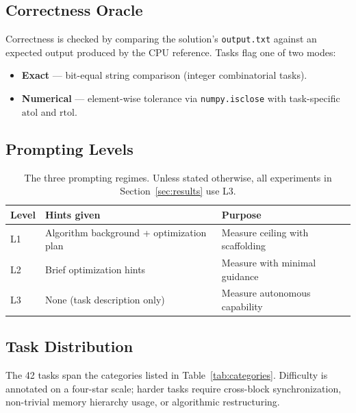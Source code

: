 \documentclass{article}
\begin{document}
\subsection{Correctness Oracle}

Correctness is checked by comparing the solution's \texttt{output.txt}
against an expected output produced by the CPU reference. Tasks flag
one of two modes:
\begin{itemize}
  \item \textbf{Exact} --- bit-equal string comparison (integer
        combinatorial tasks).
  \item \textbf{Numerical} --- element-wise tolerance via
        \texttt{numpy.isclose} with task-specific $\mathrm{atol}$ and
        $\mathrm{rtol}$.
\end{itemize}

\subsection{Prompting Levels}

\begin{table}[ht]
\centering
\small
\caption{The three prompting regimes. Unless stated otherwise, all
experiments in Section~\ref{sec:results} use L3.}
\label{tab:levels}
\begin{tabular}{@{}lll@{}}
\toprule
\textbf{Level} & \textbf{Hints given} & \textbf{Purpose} \\
\midrule
L1 & Algorithm background + optimization plan & Measure ceiling with scaffolding \\
L2 & Brief optimization hints & Measure with minimal guidance \\
L3 & None (task description only) & Measure autonomous capability \\
\bottomrule
\end{tabular}
\end{table}

\subsection{Task Distribution}

The 42 tasks span the categories listed in Table~\ref{tab:categories}.
Difficulty is annotated on a four-star scale; harder tasks require
cross-block synchronization, non-trivial memory hierarchy usage, or
algorithmic restructuring.
\end{document}
